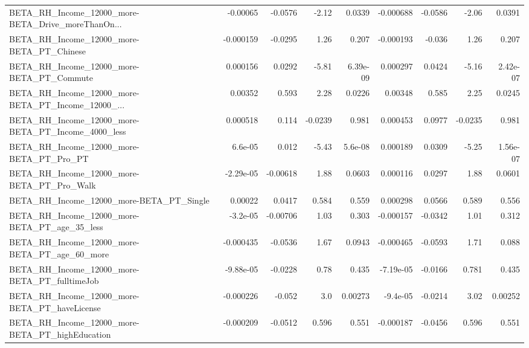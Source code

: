 \begin{tabular}{lrrrrrrrr}
BETA\_RH\_Income\_12000\_more-BETA\_Drive\_moreThanOn... &    -0.00065 &      -0.0576 &     -2.12 &   0.0339 &  -0.000688 &     -0.0586 &        -2.06 &        0.0391 \\
BETA\_RH\_Income\_12000\_more-BETA\_PT\_Chinese          &   -0.000159 &      -0.0295 &      1.26 &    0.207 &  -0.000193 &      -0.036 &         1.26 &         0.207 \\
BETA\_RH\_Income\_12000\_more-BETA\_PT\_Commute          &    0.000156 &       0.0292 &     -5.81 & 6.39e-09 &   0.000297 &      0.0424 &        -5.16 &      2.42e-07 \\
BETA\_RH\_Income\_12000\_more-BETA\_PT\_Income\_12000\_... &     0.00352 &        0.593 &      2.28 &   0.0226 &    0.00348 &       0.585 &         2.25 &        0.0245 \\
BETA\_RH\_Income\_12000\_more-BETA\_PT\_Income\_4000\_less &    0.000518 &        0.114 &   -0.0239 &    0.981 &   0.000453 &      0.0977 &      -0.0235 &         0.981 \\
BETA\_RH\_Income\_12000\_more-BETA\_PT\_Pro\_PT           &     6.6e-05 &        0.012 &     -5.43 &  5.6e-08 &   0.000189 &      0.0309 &        -5.25 &      1.56e-07 \\
BETA\_RH\_Income\_12000\_more-BETA\_PT\_Pro\_Walk         &   -2.29e-05 &     -0.00618 &      1.88 &   0.0603 &   0.000116 &      0.0297 &         1.88 &        0.0601 \\
BETA\_RH\_Income\_12000\_more-BETA\_PT\_Single           &     0.00022 &       0.0417 &     0.584 &    0.559 &   0.000298 &      0.0566 &        0.589 &         0.556 \\
BETA\_RH\_Income\_12000\_more-BETA\_PT\_age\_35\_less      &    -3.2e-05 &     -0.00706 &      1.03 &    0.303 &  -0.000157 &     -0.0342 &         1.01 &         0.312 \\
BETA\_RH\_Income\_12000\_more-BETA\_PT\_age\_60\_more      &   -0.000435 &      -0.0536 &      1.67 &   0.0943 &  -0.000465 &     -0.0593 &         1.71 &         0.088 \\
BETA\_RH\_Income\_12000\_more-BETA\_PT\_fulltimeJob      &   -9.88e-05 &      -0.0228 &      0.78 &    0.435 &  -7.19e-05 &     -0.0166 &        0.781 &         0.435 \\
BETA\_RH\_Income\_12000\_more-BETA\_PT\_haveLicense      &   -0.000226 &       -0.052 &       3.0 &  0.00273 &   -9.4e-05 &     -0.0214 &         3.02 &       0.00252 \\
BETA\_RH\_Income\_12000\_more-BETA\_PT\_highEducation    &   -0.000209 &      -0.0512 &     0.596 &    0.551 &  -0.000187 &     -0.0456 &        0.596 &         0.551 \\

\end{tabular}
